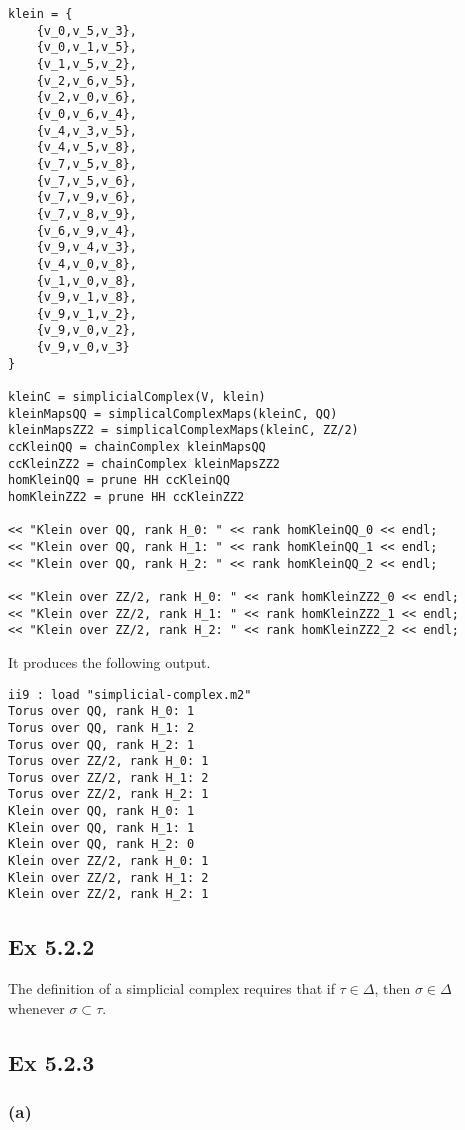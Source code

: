 \documentclass{article}
\theoremstyle{definition}
\begin{document}
\begin{lstlisting}[language=Macaulay2]
klein = {
	{v_0,v_5,v_3},
	{v_0,v_1,v_5},
	{v_1,v_5,v_2},
	{v_2,v_6,v_5},
	{v_2,v_0,v_6},
	{v_0,v_6,v_4},
	{v_4,v_3,v_5},
	{v_4,v_5,v_8},
	{v_7,v_5,v_8},
	{v_7,v_5,v_6},
	{v_7,v_9,v_6},
	{v_7,v_8,v_9},
	{v_6,v_9,v_4},
	{v_9,v_4,v_3},
	{v_4,v_0,v_8},
	{v_1,v_0,v_8},
	{v_9,v_1,v_8},
	{v_9,v_1,v_2},
	{v_9,v_0,v_2},
	{v_9,v_0,v_3}
}

kleinC = simplicialComplex(V, klein)
kleinMapsQQ = simplicalComplexMaps(kleinC, QQ)
kleinMapsZZ2 = simplicalComplexMaps(kleinC, ZZ/2)
ccKleinQQ = chainComplex kleinMapsQQ
ccKleinZZ2 = chainComplex kleinMapsZZ2
homKleinQQ = prune HH ccKleinQQ
homKleinZZ2 = prune HH ccKleinZZ2

<< "Klein over QQ, rank H_0: " << rank homKleinQQ_0 << endl;
<< "Klein over QQ, rank H_1: " << rank homKleinQQ_1 << endl;
<< "Klein over QQ, rank H_2: " << rank homKleinQQ_2 << endl;

<< "Klein over ZZ/2, rank H_0: " << rank homKleinZZ2_0 << endl;
<< "Klein over ZZ/2, rank H_1: " << rank homKleinZZ2_1 << endl;
<< "Klein over ZZ/2, rank H_2: " << rank homKleinZZ2_2 << endl;
\end{lstlisting} 

\vspace*{20px}
It produces the following output.
\vspace*{20px}

\begin{lstlisting}[language=Macaulay2output]
ii9 : load "simplicial-complex.m2"
Torus over QQ, rank H_0: 1
Torus over QQ, rank H_1: 2
Torus over QQ, rank H_2: 1
Torus over ZZ/2, rank H_0: 1
Torus over ZZ/2, rank H_1: 2
Torus over ZZ/2, rank H_2: 1
Klein over QQ, rank H_0: 1
Klein over QQ, rank H_1: 1
Klein over QQ, rank H_2: 0
Klein over ZZ/2, rank H_0: 1
Klein over ZZ/2, rank H_1: 2
Klein over ZZ/2, rank H_2: 1	
\end{lstlisting}


\subsection*{Ex 5.2.2}

The definition of a simplicial complex requires that if $\tau \in \Delta$, then
$\sigma \in \Delta$ whenever $\sigma \subset \tau$.

\subsection*{Ex 5.2.3}

\subsubsection*{(a)}
\end{document}
